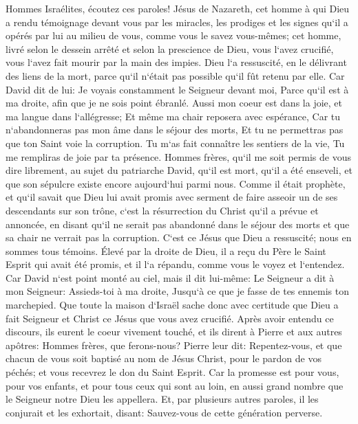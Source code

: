 \verse Hommes Israélites, écoutez ces paroles! Jésus de Nazareth, cet homme à qui Dieu a rendu témoignage devant vous par les miracles, les prodiges et les signes qu`il a opérés par lui au milieu de vous, comme vous le savez vous-mêmes; 
\verse cet homme, livré selon le dessein arrêté et selon la prescience de Dieu, vous l`avez crucifié, vous l`avez fait mourir par la main des impies. 
\verse Dieu l`a ressuscité, en le délivrant des liens de la mort, parce qu`il n`était pas possible qu`il fût retenu par elle. 
\verse Car David dit de lui: Je voyais constamment le Seigneur devant moi, Parce qu`il est à ma droite, afin que je ne sois point ébranlé. 
\verse Aussi mon coeur est dans la joie, et ma langue dans l`allégresse; Et même ma chair reposera avec espérance, 
\verse Car tu n`abandonneras pas mon âme dans le séjour des morts, Et tu ne permettras pas que ton Saint voie la corruption. 
\verse Tu m`as fait connaître les sentiers de la vie, Tu me rempliras de joie par ta présence. 
\verse Hommes frères, qu`il me soit permis de vous dire librement, au sujet du patriarche David, qu`il est mort, qu`il a été enseveli, et que son sépulcre existe encore aujourd`hui parmi nous. 
\verse Comme il était prophète, et qu`il savait que Dieu lui avait promis avec serment de faire asseoir un de ses descendants sur son trône, 
\verse c`est la résurrection du Christ qu`il a prévue et annoncée, en disant qu`il ne serait pas abandonné dans le séjour des morts et que sa chair ne verrait pas la corruption. 
\verse C`est ce Jésus que Dieu a ressuscité; nous en sommes tous témoins. 
\verse Élevé par la droite de Dieu, il a reçu du Père le Saint Esprit qui avait été promis, et il l`a répandu, comme vous le voyez et l`entendez. 
\verse Car David n`est point monté au ciel, mais il dit lui-même: Le Seigneur a dit à mon Seigneur: Assieds-toi à ma droite, 
\verse Jusqu`à ce que je fasse de tes ennemis ton marchepied. 
\verse Que toute la maison d`Israël sache donc avec certitude que Dieu a fait Seigneur et Christ ce Jésus que vous avez crucifié. 
\verse Après avoir entendu ce discours, ils eurent le coeur vivement touché, et ils dirent à Pierre et aux autres apôtres: Hommes frères, que ferons-nous? 
\verse Pierre leur dit: Repentez-vous, et que chacun de vous soit baptisé au nom de Jésus Christ, pour le pardon de vos péchés; et vous recevrez le don du Saint Esprit. 
\verse Car la promesse est pour vous, pour vos enfants, et pour tous ceux qui sont au loin, en aussi grand nombre que le Seigneur notre Dieu les appellera. 
\verse Et, par plusieurs autres paroles, il les conjurait et les exhortait, disant: Sauvez-vous de cette génération perverse. 
